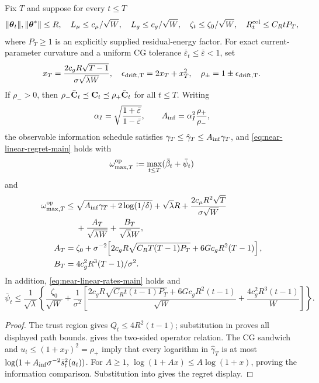 \documentclass[twoside]{article}
\begin{document}
\begin{corollary}\label{cor:near-linear}
Fix $T$ and suppose for every $t\le T$
\[
 \|\boldsymbol{\theta}_t\|,\|\boldsymbol{\theta}^*\|\le R,\quad
 L_\mu\le c_\mu/\sqrt W,\quad L_g\le c_g/\sqrt W,\quad
 \zeta_t\le\zeta_0/\sqrt W,\quad
 R_t^{\rm col}\le C_RtP_T ,
\]
where $P_T\ge1$ is an explicitly supplied residual-energy factor.  For exact
current-parameter curvature and a uniform CG tolerance
$\bar\varepsilon_t\le\bar\varepsilon<1$, set
\[
 x_T=\frac{2c_gR\sqrt{T-1}}{\sigma\sqrt{\lambda W}},\quad
 \epsilon_{\rm drift,T}=2x_T+x_T^2,\quad
 \rho_\pm=1\pm\epsilon_{\rm drift,T}.
\]
If $\rho_->0$, then
$\rho_-\bar{\mathbf{C}}_t\preceq\mathbf{C}_t\preceq\rho_+\bar{\mathbf{C}}_t$ for all $t\le T$.
Writing
\[
 \alpha_I=\sqrt{\frac{1+\bar\varepsilon}{1-\bar\varepsilon}},\qquad
 A_{\rm inf}=\alpha_I^2\frac{\rho_+}{\rho_-},
\]
the observable information schedule satisfies
$\gamma_T\le\hat\gamma_T\le A_{\rm inf}\gamma_T$, and
\eqref{eq:near-linear-regret-main} holds with
\[\omega_{\max,T}^{\rm op}:=
\max_{t\le T}(\bar\beta_t+\bar\psi_t)\]
and
\begin{align*}
 \omega_{\max,T}^{\rm op}\le{}&
 \sqrt{A_{\rm inf}\gamma_T+2\log(1/\delta)}+\sqrt\lambda R
 +\frac{2c_\mu R^2\sqrt T}{\sigma\sqrt W}\\
 &+\frac{A_T}{\sqrt{\lambda W}}+\frac{B_T}{\sqrt\lambda W},\\
 A_T={}&\zeta_0+\sigma^{-2}\!\left[
 2c_gR\sqrt{C_RT(T-1)P_T}+6Gc_gR^2(T-1)\right],\\
 B_T={}&4c_g^2R^3(T-1)/\sigma^2 .
\end{align*}
In addition, \eqref{eq:near-linear-rates-main} holds and
\[
 \bar\psi_t\le\frac1{\sqrt\lambda}\!\left\{
 \frac{\zeta_0}{\sqrt W}+\frac1{\sigma^2}\!\left[
 \frac{2c_gR\sqrt{C_Rt(t-1)P_T}+6Gc_gR^2(t-1)}{\sqrt W}
 +\frac{4c_g^2R^3(t-1)}{W}\right]\right\}.
\]
\end{corollary}
\begin{proof}
The trust region gives $Q_t\le4R^2(t-1)$; substitution in
 proves all displayed path bounds.
 gives the two-sided operator relation.
The CG sandwich and $u_t\le(1+x_T)^2=\rho_+$ imply that every logarithm in
$\hat\gamma_T$ is at most
$\log(1+A_{\rm inf}\sigma^{-2}\bar s_t^2(a_t))$.
For $A\ge1$, $\log(1+Ax)\le A\log(1+x)$, proving the information comparison.
Substitution into  gives the regret display.
\end{proof}
\end{document}
